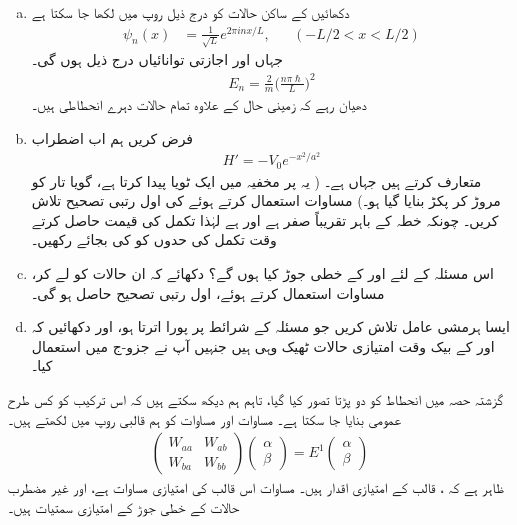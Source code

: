 \begin{enumerate}[a.]
\item
دکھائیں کے ساکن حالات کو درج ذیل روپ میں لکھا جا سکتا ہے 
 \begin{align*}
\psi_n (x) &= \frac{1}{\sqrt{L}} e^{2 \pi i n x/ L}, &&(-L/2 < x < L/2)
\end{align*}
جہاں  اور اجازتی توانائیاں درج ذیل ہوں گی۔
\begin{align*}
E_n = \frac{2}{m} \big ( \frac{n \pi \hslash}{L} \big )^2
\end{align*}
دھیان رہے کہ زمینی حال  کے علاوہ تمام حالات دہرے انحطاطی ہیں۔ 
\item
فرض کریں ہم اب اضطراب 
\begin{align*}
H' = -V_0 e^{-x^2 / a^2}
\end{align*}
متعارف کرتے ہیں جہاں  ہے۔ ( یہ  پر مخفیہ میں ایک ٹویا پیدا کرتا ہے، گویا تار کو مروڑ کر پکڑ بنایا گیا ہو۔) مساوات  استعمال کرتے ہوئے  کی اول رتبی تصحیح تلاش کریں۔  چونکہ  خطہ  کے باہر تقریباً صفر ہے اور  ہے لہٰذا تکمل کی قیمت حاصل کرتے وقت تکمل کی حدوں کو  کی بجائے  رکھیں۔
\item
اس مسئلہ کے لئے  اور  کے  خطی جوڑ کیا ہوں گے؟ دکھائے کہ ان حالات کو لے کر، مساوات  استعمال کرتے ہوئے، اول رتبی تصحیح حاصل ہو گی۔ 
\item
ایسا ہرمشی عامل  تلاش کریں جو مسئلہ کے شرائط پر پورا اترتا ہو، اور دکھائیں کہ  اور  کے بیک وقت امتیازی حالات ٹھیک وہی ہیں جنہیں آپ نے جزو-ج میں استعمال کیا۔
\end{enumerate}


گزشتہ حصہ میں انحطاط کو دو پڑتا تصور کیا گیا، تاہم ہم دیکھ سکتے ہیں کہ اس ترکیب کو کس طرح عمومی بنایا جا سکتا ہے۔ مساوات  اور مساوات  کو ہم قالبی روپ میں لکھتے ہیں۔ 
\begin{align}
\begin{pmatrix} 
W_{aa} & W_{ab} \\
W_{ba} & W_{bb}
\end{pmatrix}
\begin{pmatrix}
\alpha \\
\beta
\end{pmatrix}
= E^1
\begin{pmatrix}
\alpha \\
\beta
\end{pmatrix}
\end{align}
ظاہر ہے کہ  ، قالب کے امتیازی اقدار ہیں۔ مساوات  اس قالب کی امتیازی مساوات ہے، اور غیر مضطرب حالات کے  خطی جوڑ  کے امتیازی سمتیات ہیں۔

